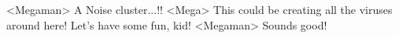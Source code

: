 <Megaman> A Noise cluster...!! 
<Mega> This could be creating all the viruses around here! 
Let's have some fun, kid! 
<Megaman> Sounds good! 
